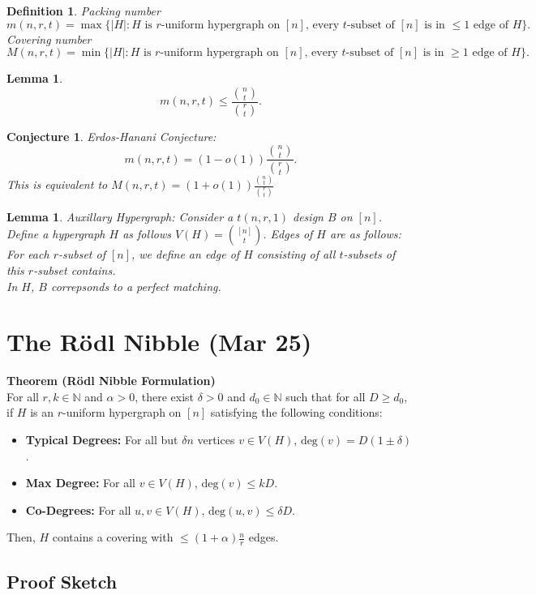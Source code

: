 \documentclass[a4paper]{article}
\newtheorem{lem}[thm]{Lemma}
\newtheorem{defn}[thm]{Definition}
\newtheorem{conj}[thm]{Conjecture}
\begin{document}
\begin{defn}
    Packing number \[
    m(n,r,t)= \max \{|H| :H \text{ is $r$-uniform hypergraph on $[n]$, every $t$-subset of $[n]$ is in $\leq 1$ edge of $H$}\}
    .\]
    Covering number
    \[
    M(n,r,t)= \min \{|H| :H \text{ is $r$-uniform hypergraph on $[n]$, every $t$-subset of $[n]$ is in $\geq 1$ edge of $H$}\}
    .\] 
\end{defn}
\begin{lem}
    \[
    m(n,r,t)\leq \frac{\binom{n}{t}}{\binom{r}{t}}
    .\] 
\end{lem}
\begin{conj}
    Erdos-Hanani Conjecture:
    \[
    m(n,r,t)=(1-o(1))\frac{\binom{n}{t}}{\binom{r}{t}}
    .\] 
    This is equivalent to $M(n,r,t)=(1+o(1))\frac{\binom{n}{t}}{\binom{r}{t}}$
\end{conj}
\begin{lem}
    Auxillary Hypergraph: Consider a $t(n,r,1)$ design $B$ on $[n]$. Define a hypergraph $H$ as follows $V(H)= \binom{[n]}{t}$. Edges of $H$ are as follows: For each $r$-subset of $[n]$, we define an edge of $H$ consisting of all $t$-subsets of this $r$-subset contains. \\
    In $H$, $B$ correpsonds to a perfect matching. 
\end{lem}
\newpage
\section{The R\"odl Nibble (Mar 25)}

\textbf{Theorem (R\"odl Nibble Formulation)} \\
For all $r, k \in \mathbb{N}$ and $\alpha > 0$, there exist $\delta > 0$ and $d_0 \in \mathbb{N}$ such that for all $D \ge d_0$, if $H$ is an $r$-uniform hypergraph on $[n]$ satisfying the following conditions:
\begin{itemize}
    \item \textbf{Typical Degrees:} For all but $\delta n$ vertices $v \in V(H)$, $\text{deg}(v) = D(1 \pm \delta)$.
    \item \textbf{Max Degree:} For all $v \in V(H)$, $\text{deg}(v) \le kD$.
    \item \textbf{Co-Degrees:} For all $u, v \in V(H)$, $\text{deg}(u, v) \le \delta D$.
\end{itemize}
Then, $H$ contains a covering with $\le (1 + \alpha)\frac{n}{r}$ edges.

\hrulefill

\subsection*{Proof Sketch}
\end{document}
